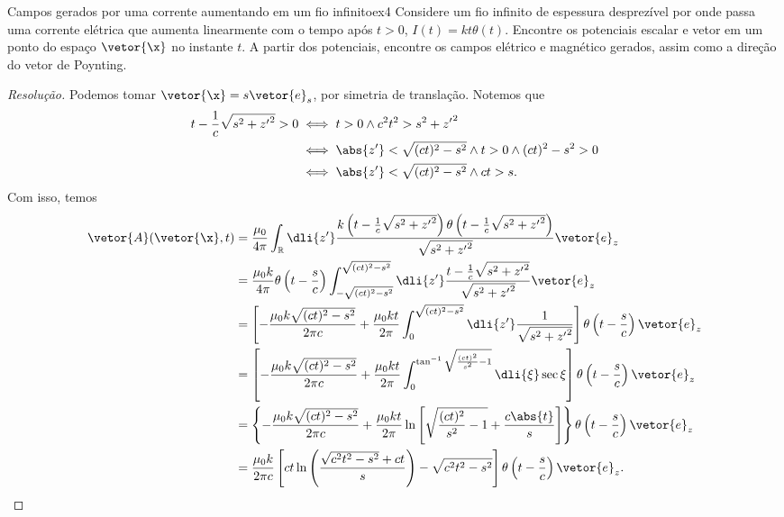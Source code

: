 \begin{exercício}{Campos gerados por uma corrente aumentando em um fio infinito}{ex4}
   Considere um fio infinito de espessura desprezível por onde passa uma corrente elétrica que aumenta linearmente com o tempo após \(t > 0\), \(I(t) = kt\theta(t)\). Encontre os potenciais escalar e vetor em um ponto do espaço \(\vetor{\x}\) no instante \(t\). A partir dos potenciais, encontre os campos elétrico e magnético gerados, assim como a direção do vetor de Poynting.
\end{exercício}
\begin{proof}[Resolução]
   Podemos tomar \(\vetor{\x} = s \vetor{e}_s\), por simetria de translação. Notemos que
   \begin{align*}
      t - \frac1c\sqrt{s^2 + {z'}^2} > 0 &\iff t > 0 \land c^2 t^2 > s^2 + {z'}^2\\
      &\iff \abs{z'} < \sqrt{(ct)^2 - s^2} \land t > 0 \land (ct)^2 - s^2 > 0\\
                                         &\iff \abs{z'} < \sqrt{(ct)^2 - s^2} \land ct > s.
   \end{align*}
   Com isso, temos
   \begin{align*}
      \vetor{A}(\vetor{\x}, t) &= \frac{\mu_0}{4\pi} \int_{\mathbb{R}} \dli{z'} \frac{k \left(t - \frac1c\sqrt{s^2 + {z'}^2}\right) \theta\left(t - \frac1c\sqrt{s^2 + {z'}^2}\right)}{\sqrt{s^2 + {z'}^2}}\vetor{e}_z\\
                               &= \frac{\mu_0 k}{4\pi} \theta\left(t - \frac{s}c\right)\int_{-\sqrt{(ct)^2 - s^2}}^{\sqrt{(ct)^2 - s^2}} \dli{z'} \frac{t - \frac1c \sqrt{s^2 + {z'}^2}}{\sqrt{s^2 + {z'}^2}}\vetor{e}_z\\
                               &= \left[-\frac{\mu_0 k\sqrt{(ct)^2 - s^2}}{2\pi c} + \frac{\mu_0 kt}{2\pi} \int_{0}^{\sqrt{(ct)^2 - s^2}} \dli{z'} \frac{1}{\sqrt{s^2 + {z'}^2}}\right]\theta\left(t - \frac{s}{c}\right)\vetor{e}_z\\
                               &= \left[-\frac{\mu_0 k\sqrt{(ct)^2 - s^2}}{2\pi c}+ \frac{\mu_0 kt}{2\pi} \int_{0}^{\tan^{-1}\sqrt{\frac{(ct)^2}{s^2} - 1}} \dli{\xi} \sec\xi\right]\theta\left(t - \frac{s}{c}\right)\vetor{e}_z\\
                               &= \left\{-\frac{\mu_0 k\sqrt{(ct)^2 - s^2}}{2\pi c}+ \frac{\mu_0 kt}{2\pi} \ln\left[\sqrt{\frac{(ct)^2}{s^2} - 1} + \frac{c\abs{t}}{s}\right]\right\} \theta\left(t - \frac{s}{c}\right)\vetor{e}_z\\
                               &= \frac{\mu_0 k}{2\pi c} \left[ct \ln\left(\frac{\sqrt{c^2 t^2 - s^2} + c t}{s}\right) - \sqrt{c^2 t^2 - s^2}\right]\theta\left(t - \frac{s}{c}\right)\vetor{e}_z.

\end{align*}
\end{proof}
